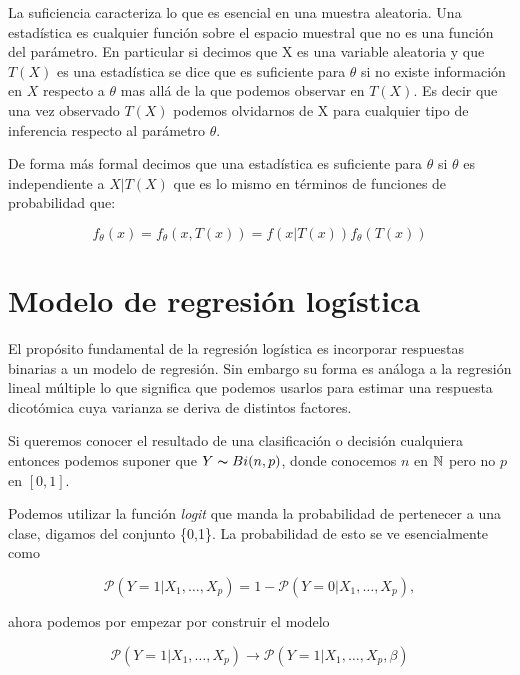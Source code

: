 \begin{definition}[Suficiencia]
La suficiencia caracteriza lo que es esencial en una muestra aleatoria. Una estadística es cualquier función sobre el espacio muestral que no es una función del parámetro. En particular si decimos que X es una variable aleatoria y que $T(X)$ es una estadística se dice que es suficiente para $\theta$ si no existe información en $X$ respecto a $\theta$ mas allá de la que podemos observar en $T(X)$. Es decir que una vez observado $T(X)$ podemos olvidarnos de X para cualquier tipo de inferencia respecto al parámetro $\theta$. 

De forma más formal decimos que una estadística es suficiente para $\theta$ si $\theta$ es independiente a $X|T(X)$ que es lo mismo en términos de funciones de probabilidad que:

\begin{equation}
    f_\theta(x) = f_\theta(x,T(x)) = f(x|T(x))f_\theta(T(x))
\end{equation}


\end{definition}


\section{Modelo de regresión logística}

El propósito fundamental de la regresión logística es incorporar respuestas binarias a un modelo de regresión. Sin embargo su forma es análoga a la regresión lineal múltiple lo que significa que podemos usarlos para estimar una respuesta dicotómica cuya varianza se deriva de distintos factores.

Si queremos conocer el resultado de una clasificación o decisión cualquiera entonces podemos suponer que $Y \thicksim Bi(n,p)$, donde conocemos $n$ en $ \mathbb{N}$ pero no $p$ en $[0,1]$.

Podemos utilizar la función \textit{logit} que manda la probabilidad de pertenecer a una clase, digamos del conjunto \{0,1\}. La probabilidad de esto se ve esencialmente como

\begin{equation}
    \mathcal{P}(Y=1|X_1,\ldots,X_p) = 1- \mathcal{P}(Y=0|X_1,\ldots,X_p),
\end{equation}

ahora podemos por empezar por construir el modelo  

\begin{equation}
    \mathcal{P}(Y=1|X_1,\ldots,X_p) \to \mathcal{P}(Y=1|X_1,\ldots,X_p,\beta)
\end{equation}

